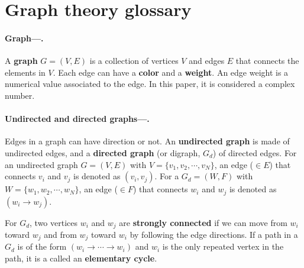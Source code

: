 \documentclass[a4paper,twocolumn,8pt,accepted=2021-12-15]{quantumarticle}
\begin{document}
	\appendix 

	\section{Graph theory glossary}\label{glossary}
	
	\paragraph{Graph---.} A \textbf{graph} $G=(V,E)$ is a collection of vertices $V$ and edges $E$ that connects the elements in $V$. Each edge can have  a \textbf{color} and a \textbf{weight}. An edge weight is a numerical value associated to the edge. In this paper, it is considered a complex number. 
	
	\paragraph{Undirected and directed graphs---.} Edges in a graph can have direction or not. An \textbf{undirected graph}  is made of undirected edges, and a \textbf{directed graph} (or digraph, $G_d$) of directed edges. For an undirected graph $G=(V,E)$ with $V= \{v_1,v_2,\cdots, v_N\}$, an edge ($\in E$) that connects $v_i$ and $v_j$ is denoted as $(v_i,v_j)$. 
	For a $G_d=(W,F)$ with $W=\{w_1,w_2,\cdots, w_N\}$, an edge ($\in F$) that connects $w_i$ and $w_j$ is denoted as $(w_i\to w_j)$.  
	
	For $G_d$, two vertices $w_i$ and $w_j$ are \textbf{strongly connected} if we can move from $w_i$ toward $w_j$ and from $w_j$ toward $w_i$ by  following the edge directions. If a path in a $G_d$ is of the form $(w_i\to \cdots \to w_i)$ and $w_i$ is the only repeated vertex in the path, it is a called an \textbf{elementary cycle}.     
	
\end{document}
